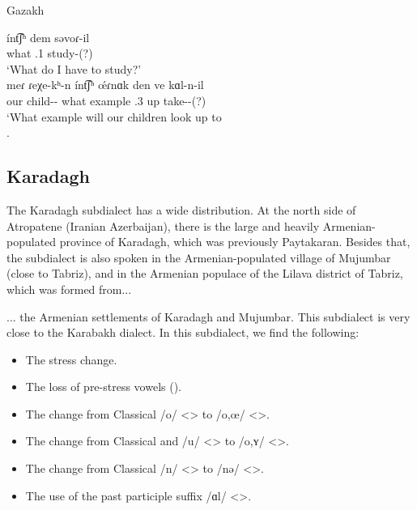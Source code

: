 \begin{exe}
	\ex Gazakh \label{sent:Karabakh:subdialct:Gazakh:deb}
	\begin{xlist}
		\ex \gll \'int͡ʃʰ dem səvoɾ-il \\
		what {\deb}.1{\sg} study-{\ptcp}(?) \\
		\trans  `What do I have to study?'   \\
		\ex \gll meɾ ɾeχe-kʰ-n \'int͡ʃʰ \'œɾnɑk den ve kɑl-n-il \\
		our child-{\pl}-{} what example {\deb}.3{\pl} up take-{\vx}-{\ptcp}(?)\\
		\trans `What example will our children look up to \\
		.
	\end{xlist}
	
\end{exe}

\subsection{Karadagh}

The Karadagh subdialect has a wide distribution. At the north side of Atropatene (Iranian Azerbaijan), there is the large and heavily Armenian-populated province of Karadagh, which was   previously Paytakaran. Besides that, the subdialect is also spoken in the Armenian-populated village of Mujumbar (close to Tabriz), and in the Armenian populace of the Lilava district of Tabriz, which was formed from... 


\begin{adjarianpage}\label{page:71}\end{adjarianpage}%

... the Armenian settlements of Karadagh and Mujumbar. This subdialect is very close to the Karabakh dialect. In this subdialect, we find the following:\begin{itemize}
	\item The stress change.
	\item The loss of pre-stress vowels ().
	\item The change from Classical /o/ <> to /o,œ/ <>.
	\item The change from Classical and /u/ <> to /o,ʏ/ <>. 
	\item The change from Classical /n/ <> to /nə/ <>. 
	\item The use of the past participle suffix  /ɑl/ <>. 
\end{itemize}


